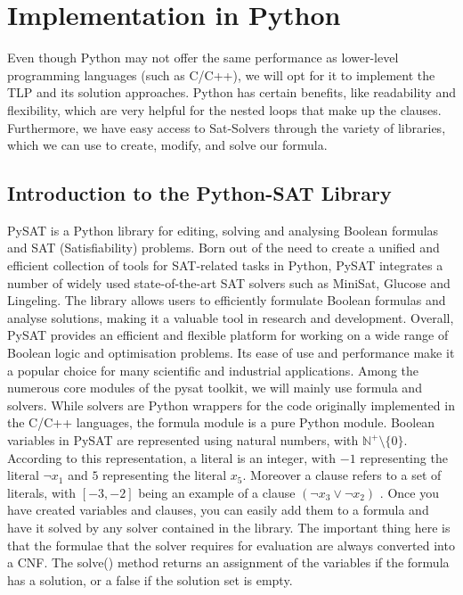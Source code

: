 \documentclass[bachelor, english]{algothesis}
\begin{document}
\chapter{Implementation in Python}
Even though Python may not offer the same performance as lower-level programming languages (such as C/C++), we will opt for it to implement the TLP and its solution approaches. Python has certain benefits, like readability and flexibility, which are very helpful for the nested loops that make up the clauses. Furthermore, we have easy access to Sat-Solvers through the variety of libraries, which we can use to create, modify, and solve our formula.

\section{Introduction to the Python-SAT Library}
PySAT is a Python library for editing, solving and analysing Boolean formulas and SAT (Satisfiability) problems. Born out of the need to create a unified and efficient collection of tools for SAT-related tasks in Python, PySAT integrates a number of widely used state-of-the-art SAT solvers such as MiniSat, Glucose and Lingeling. The library allows users to efficiently formulate Boolean formulas and analyse solutions, making it a valuable tool in research and development. Overall, PySAT provides an efficient and flexible platform for working on a wide range of Boolean logic and optimisation problems. Its ease of use and performance make it a popular choice for many scientific and industrial applications. Among the numerous core modules of the pysat toolkit, we will mainly use formula and solvers. While solvers are Python wrappers for the code originally implemented in the C/C++ languages, the formula module is a pure Python module. Boolean variables in PySAT are represented using natural numbers, with $\mathbb{N}^+\setminus\{0\}$. According to this representation, a literal is an integer, with $-1$ representing the literal $\lnot x_1$ and $5$ representing the literal $x_5$. Moreover a clause refers to a set of literals, with $[-3, -2]$ being an example of a clause $(\lnot x_3 \lor \lnot x_2)$ \cite{PySAT}. Once you have created variables and clauses, you can easily add them to a formula and have it solved by any solver contained in the library. The important thing here is that the formulae that the solver requires for evaluation are always converted into a CNF. The solve() method returns an assignment of the variables if the formula has a solution, or a false if the solution set is empty.
\end{document}
